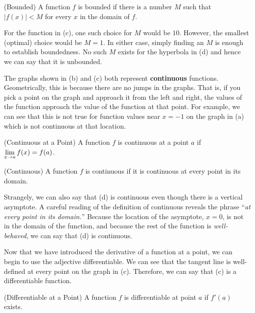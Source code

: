 \begin{definition} (Bounded) A function $f$ is bounded if there is a
number $M$ such that $|f(x)| < M$ for every $x$ in the domain of $f$.
\end{definition}

For the function in (c), one such choice for $M$ would be $10$.  However,
the smallest (optimal) choice would be $M=1$.  In either case, simply
finding an $M$ is enough to establish boundedness.  No such $M$ exists for
the hyperbola in (d) and hence we can say that it is 
{\dfont unbounded}.  

  The graphs shown in (b) and (c) both represent
{\bf continuous} functions.  Geometrically, this is because there are no
jumps in the graphs.  That is, if you pick a point on the graph and
approach it from the left and right, the values of the function approach
the value of the function at that point.  For example, we can see that this
is not true for function values near $x=-1$ on the graph in (a) which is
not continuous at that location.  

\begin{definition} (Continuous at a Point) A function $f$ is continuous
at a point $a$ if $\displaystyle \lim_{x\to a} f(x) = f(a)$.  
\end{definition}

\begin{definition} (Continuous) A function $f$ is continuous if it is
continuous at every point in its domain.
\end{definition}

Strangely, we can also say that (d) is continuous even though there is a
vertical asymptote.  A careful reading of the definition of continuous
reveals the phrase ``{\em at every point in its domain.}''  Because the
location of the asymptote, $x=0$, is not in the domain of the function, and
because the rest of the function is {\em well-behaved}, we can say that (d)
is continuous.

 Now that we have introduced the derivative
of a function at a point, we can begin to use the adjective {\dfont
differentiable}.  
We can see that the tangent line is well-defined at every
point on the graph in (c).  Therefore, we can say that (c) is a
differentiable function.

\begin{definition} (Differentiable at a Point) A function $f$ is
differentiable at point $a$ if $f'(a)$ exists.
\end{definition}

